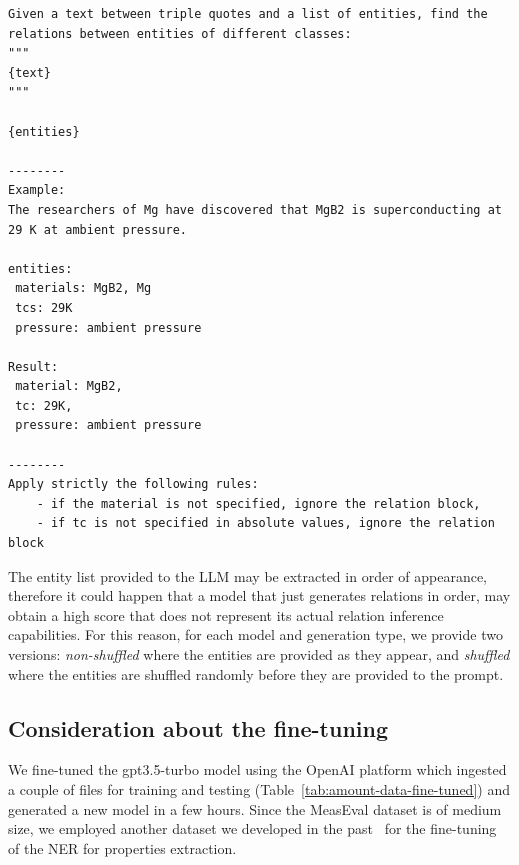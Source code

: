 \documentclass[a4paper]{article}
\begin{document}
\begin{lstlisting}[caption=Few-shot generation for extracting relations from lists of entities]
Given a text between triple quotes and a list of entities, find the relations between entities of different classes: 
"""
{text}
"""

{entities}

--------
Example: 
The researchers of Mg have discovered that MgB2 is superconducting at 29 K at ambient pressure.

entities:
 materials: MgB2, Mg
 tcs: 29K
 pressure: ambient pressure
 
Result: 
 material: MgB2, 
 tc: 29K, 
 pressure: ambient pressure
 
--------
Apply strictly the following rules:  
    - if the material is not specified, ignore the relation block,
    - if tc is not specified in absolute values, ignore the relation block 
\end{lstlisting}


The entity list provided to the LLM may be extracted in order of appearance, therefore it could happen that a model that just generates relations in order, may obtain a high score that does not represent its actual relation inference capabilities. 
For this reason, for each model and generation type, we provide two versions: \emph{non-shuffled} where the entities are provided as they appear, and \emph{shuffled} where the entities are shuffled randomly before they are provided to the prompt. 

\subsection{Consideration about the fine-tuning}

We fine-tuned the gpt3.5-turbo model using the OpenAI platform which ingested a couple of files for training and testing (Table~\ref{tab:amount-data-fine-tuned}) and generated a new model in a few hours.
Since the MeasEval dataset is of medium size, we employed another dataset we developed in the past~\cite{foppiano2019quantities} for the fine-tuning of the NER for properties extraction. 
\end{document}
